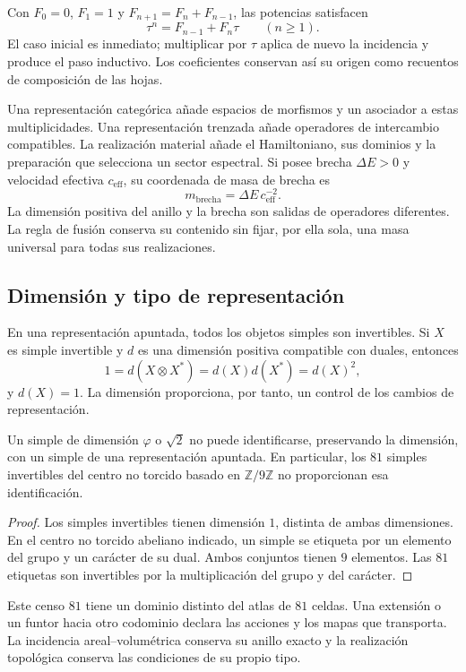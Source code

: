 Con $F_0=0$, $F_1=1$ y $F_{n+1}=F_n+F_{n-1}$, las potencias satisfacen
\[
 \tau^n=F_{n-1}+F_n\tau\qquad(n\geq1).
\]
El caso inicial es inmediato; multiplicar por $\tau$ aplica de nuevo
la incidencia y produce el paso inductivo. Los coeficientes conservan
así su origen como recuentos de composición de las hojas.

Una representación categórica añade espacios de morfismos y un
asociador a estas multiplicidades. Una representación trenzada añade
operadores de intercambio compatibles. La realización material añade
el Hamiltoniano, sus dominios y la preparación que selecciona un
sector espectral. Si posee brecha $\Delta E>0$ y velocidad efectiva
$c_{\mathrm{eff}}$, su coordenada de masa de brecha es
\[
 m_{\mathrm{brecha}}=\Delta E\,c_{\mathrm{eff}}^{-2}.
\]
La dimensión positiva del anillo y la brecha son salidas de operadores
diferentes. La regla de fusión conserva su contenido sin fijar, por
ella sola, una masa universal para todas sus realizaciones.

\subsection{Dimensión y tipo de representación}

En una representación apuntada, todos los objetos simples son
invertibles. Si $X$ es simple invertible y $d$ es una dimensión
positiva compatible con duales, entonces
\[
 1=d(X\otimes X^*)=d(X)d(X^*)=d(X)^2,
\]
y $d(X)=1$. La dimensión proporciona, por tanto, un control de los
cambios de representación.

\begin{proposition}
\label{vi:prop:apuntada}
Un simple de dimensión $\varphi$ o $\sqrt2$ no puede identificarse,
preservando la dimensión, con un simple de una representación apuntada.
En particular, los $81$ simples invertibles del centro no torcido
basado en $\mathbb Z/9\mathbb Z$ no proporcionan esa identificación.
\end{proposition}
\begin{proof}
Los simples invertibles tienen dimensión $1$, distinta de ambas
dimensiones. En el centro no torcido abeliano indicado, un simple se
etiqueta por un elemento del grupo y un carácter de su dual. Ambos
conjuntos tienen $9$ elementos. Las $81$ etiquetas son invertibles
por la multiplicación del grupo y del carácter.
\end{proof}

Este censo $81$ tiene un dominio distinto del atlas de $81$ celdas.
Una extensión o un funtor hacia otro codominio declara las acciones
y los mapas que transporta. La incidencia areal--volumétrica conserva
su anillo exacto y la realización topológica conserva las condiciones
de su propio tipo.

